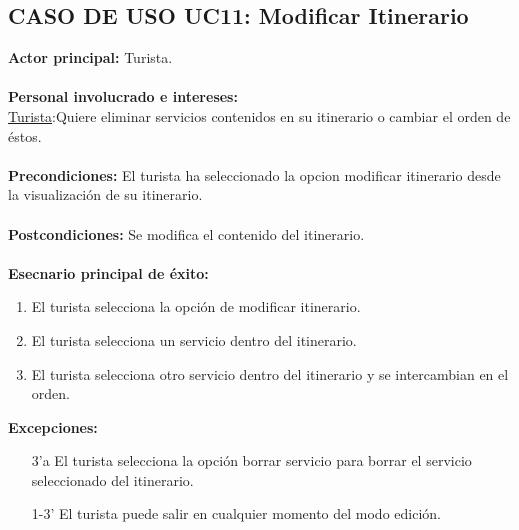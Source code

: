 \documentclass[11pt]{article}
\begin{document}
\subsection*{\textbf{CASO DE USO UC11: Modificar Itinerario}  }
\textbf{Actor principal:} Turista.\\
\\
\textbf{Personal involucrado e intereses: }\\
\underline{Turista}:Quiere eliminar servicios contenidos en su itinerario o cambiar el orden de éstos.
\\\\
\textbf{Precondiciones:} El turista ha seleccionado la opcion modificar itinerario desde la visualización de su itinerario.\\
\\
\textbf{Postcondiciones:} Se modifica el contenido del itinerario.\\
\\
\textbf{Esecnario principal de éxito:}
\begin{enumerate}
\item El turista selecciona la opción de modificar itinerario.
\item El turista selecciona un servicio dentro del itinerario.
\item El turista selecciona otro servicio dentro del itinerario y se intercambian en el orden.
\end{enumerate}
\textbf{Excepciones:}
\begin{enumerate}
\item[3'a] El turista selecciona la opción borrar servicio para borrar el servicio seleccionado del itinerario.
\item[1-3'] El turista puede salir en cualquier momento del modo edición.
\end{enumerate}
\end{document}
